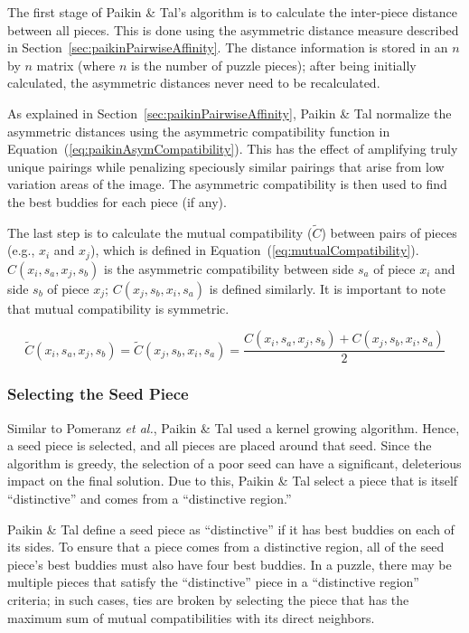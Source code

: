 \documentclass{report}
\def\eref#1{(\ref{#1})}
\begin{document}
The first stage of Paikin \& Tal's algorithm is to calculate the inter-piece distance between all pieces.  This is done using the asymmetric distance measure described in Section~\ref{sec:paikinPairwiseAffinity}.  The distance information is stored in an $n$ by $n$ matrix (where $n$ is the number of puzzle pieces); after being initially calculated, the asymmetric distances never need to be recalculated.

As explained in Section~\ref{sec:paikinPairwiseAffinity}, Paikin \& Tal normalize the asymmetric distances using the asymmetric compatibility function in Equation~\eref{eq:paikinAsymCompatibility}.  This has the effect of amplifying truly unique pairings while penalizing speciously similar pairings that arise from low variation areas of the image.  The asymmetric compatibility is then used to find the best buddies for each piece (if any).  

The last step is to calculate the mutual compatibility ($\tilde{C}$) between pairs of pieces (e.g., $x_i$ and $x_j$), which is defined in Equation~\eref{eq:mutualCompatibility}.  $C(x_i,s_a,x_j,s_b)$ is the asymmetric compatibility between side $s_a$ of piece $x_i$ and side $s_b$ of piece $x_j$; $C(x_j,s_b,x_i,s_a)$ is defined similarly.  It is important to note that mutual compatibility is symmetric.

\begin{equation} \label{eq:mutualCompatibility}
\tilde{C}(x_i,s_a,x_j,s_b)=\tilde{C}(x_j,s_b,x_i,s_a)=\frac{C(x_i,s_a,x_j,s_b) + C(x_j,s_b,x_i,s_a) }{2}
\end{equation}

\subsubsection{Selecting the Seed Piece}\label{sec:paikinTalSeedPiece}

Similar to Pomeranz \textit{et al.}, Paikin \& Tal used a kernel growing algorithm.  Hence, a seed piece is selected, and all pieces are placed around that seed.    Since the algorithm is greedy, the selection of a poor seed can have a significant, deleterious impact on the final solution.  Due to this, Paikin \& Tal select a piece that is itself ``distinctive'' and comes from a ``distinctive region.''  

Paikin \& Tal define a seed piece as ``distinctive'' if it has best buddies on each of its sides.  To ensure that a piece comes from a distinctive region, all of the seed piece's best buddies must also have four best buddies. In a puzzle, there may be multiple pieces that satisfy the ``distinctive'' piece in a ``distinctive region'' criteria; in such cases, ties are broken by selecting the piece that has the maximum sum of mutual compatibilities with its direct neighbors.
\end{document}
